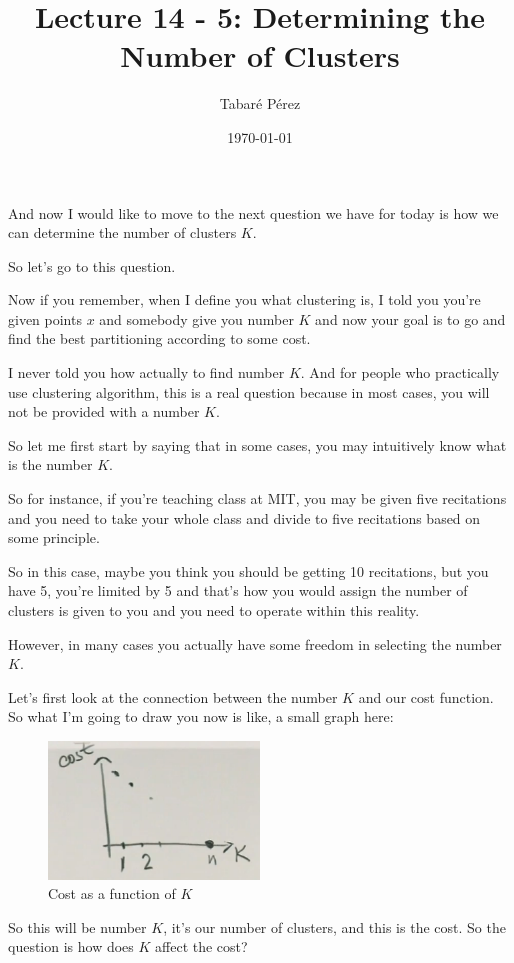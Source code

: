 \documentclass[a4paper, 12pt]{article}
\author{Tabaré Pérez}
\date{\today}
\title{Lecture 14 - 5: Determining the Number of Clusters}
\begin{document}
\maketitle
And now I would like to move to the next question we have for today is how we
can determine the number of clusters \(K\).

So let's go to this question.

Now if you remember, when I define you what clustering is, I told you you're
given points \(x\) and somebody give you number \(K\) and now your goal is to go
and find the best partitioning according to some cost.

I never told you how actually to find number \(K\). And for people who
practically use clustering algorithm, this is a real question because in most
cases, you will not be provided with a number \(K\).

So let me first start by saying that in some cases, you may intuitively know
what is the number \(K\).

So for instance, if you're teaching class at MIT, you may be given five
recitations and you need to take your whole class and divide to five recitations
based on some principle.

So in this case, maybe you think you should be getting 10 recitations, but you
have 5, you're limited by 5 and that's how you would assign the number of
clusters is given to you and you need to operate within this reality.

However, in many cases you actually
have some freedom in selecting the number \(K\).

Let's first look
at the connection between the number \(K\) and our cost function.
So what I'm going to draw you now
is like, a small graph here:


\begin{figure}[H]
\centering
\includegraphics[width=0.5\textwidth]{./pic/u04-l14-05-fig-01.png}
\caption{\label{fig:orgcec3e1f}Cost as a function of \(K\)}
\end{figure}

So this will be number \(K\), it's our number of clusters, and this is the cost.
So the question is how does \(K\) affect the cost?
\end{document}
